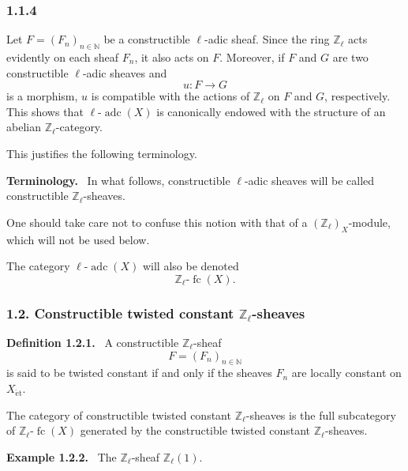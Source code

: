 \documentclass[11pt]{article}
\newenvironment{statement}[1]{\par\medskip\noindent\textbf{#1.}\ }{\par\medskip}
\providecommand{\fc}{\operatorname{fc}}
\providecommand{\adc}{\operatorname{adc}}
\begin{document}
\subsubsection*{1.1.4}\label{sga5:VI:subsubsection:1.1.4}
Let \(F=(F_n)_{n\in\mathbb N}\) be a constructible \(\ell\)-adic sheaf. Since the ring \(\mathbb Z_\ell\) acts evidently on each sheaf \(F_n\), it also acts on \(F\). Moreover, if \(F\) and \(G\) are two constructible \(\ell\)-adic sheaves and
\[
u:F\longrightarrow G
\]
is a morphism, \(u\) is compatible with the actions of \(\mathbb Z_\ell\) on \(F\) and \(G\), respectively. This shows that \(\ell\text{-}\adc(X)\) is canonically endowed with the structure of an abelian \(\mathbb Z_\ell\)-category.

This justifies the following terminology.

\begin{statement}{Terminology}
In what follows, constructible \(\ell\)-adic sheaves will be called constructible \(\mathbb Z_\ell\)-sheaves.
\end{statement}

One should take care not to confuse this notion with that of a \((\mathbb Z_\ell)_X\)-module, which will not be used below.

The category \(\ell\text{-}\adc(X)\) will also be denoted
\[
\mathbb Z_\ell\text{-}\fc(X).
\]

\subsubsection*{1.2. Constructible twisted constant \(\mathbb Z_\ell\)-sheaves}\label{sga5:VI:subsubsection:1.2}

\label{sga5:VI:definition:1.2.1}\begin{statement}{Definition 1.2.1}
A constructible \(\mathbb Z_\ell\)-sheaf
\[
F=(F_n)_{n\in\mathbb N}
\]
is said to be twisted constant if and only if the sheaves \(F_n\) are locally constant on \(X_{\mathrm{\acute et}}\).
\end{statement}

The category of constructible twisted constant \(\mathbb Z_\ell\)-sheaves is the full subcategory of \(\mathbb Z_\ell\text{-}\fc(X)\) generated by the constructible twisted constant \(\mathbb Z_\ell\)-sheaves.

\label{sga5:VI:example:1.2.2}\begin{statement}{Example 1.2.2}
The \(\mathbb Z_\ell\)-sheaf \(\mathbb Z_\ell(1)\).
\end{statement}
\end{document}
